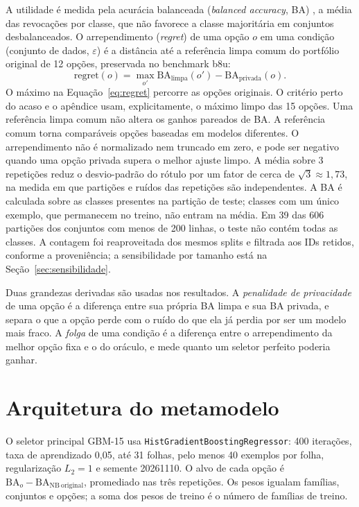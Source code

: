 A utilidade é medida pela acurácia balanceada (\textit{balanced accuracy}, BA) \cite{ref94}, a média das revocações por classe, que não favorece a classe majoritária em conjuntos desbalanceados. O arrependimento (\textit{regret}) de uma opção $o$ em uma condição (conjunto de dados, $\varepsilon$) é a distância até a referência limpa comum do portfólio original de 12 opções, preservada no benchmark b8u:
\begin{equation}
    \text{regret}(o) = \max_{o'} \text{BA}_{\text{limpa}}(o') - \text{BA}_{\text{privada}}(o).
    \label{eq:regret}
\end{equation}
O máximo na Equação~\eqref{eq:regret} percorre as opções originais. O critério perto do acaso e o apêndice usam, explicitamente, o máximo limpo das 15 opções. Uma referência limpa comum não altera os ganhos pareados de BA. A referência comum torna comparáveis opções baseadas em modelos diferentes. O arrependimento não é normalizado nem truncado em zero, e pode ser negativo quando uma opção privada supera o melhor ajuste limpo. A média sobre 3 repetições reduz o desvio-padrão do rótulo por um fator de cerca de $\sqrt{3} \approx 1{,}73$, na medida em que partições e ruídos das repetições são independentes. A BA é calculada sobre as classes presentes na partição de teste; classes com um único exemplo, que permanecem no treino, não entram na média. Em 39 das 606 partições dos conjuntos com menos de 200 linhas, o teste não contém todas as classes. A contagem foi reaproveitada dos mesmos splits e filtrada aos IDs retidos, conforme a proveniência; a sensibilidade por tamanho está na Seção~\ref{sec:sensibilidade}.

Duas grandezas derivadas são usadas nos resultados. A \emph{penalidade de privacidade} de uma opção é a diferença entre sua própria BA limpa e sua BA privada, e separa o que a opção perde com o ruído do que ela já perdia por ser um modelo mais fraco. A \emph{folga} de uma condição é a diferença entre o arrependimento da melhor opção fixa e o do oráculo, e mede quanto um seletor perfeito poderia ganhar.

\section{Arquitetura do metamodelo}
\label{sec:metamodelo}

O seletor principal GBM-15 usa \texttt{HistGradientBoostingRegressor}: 400 iterações, taxa de aprendizado 0,05, até 31 folhas, pelo menos 40 exemplos por folha, regularização $L_2=1$ e semente 20261110. O alvo de cada opção é $\mathrm{BA}_{o}-\mathrm{BA}_{\mathrm{NB\ original}}$, promediado nas três repetições. Os pesos igualam famílias, conjuntos e opções; a soma dos pesos de treino é o número de famílias de treino.

